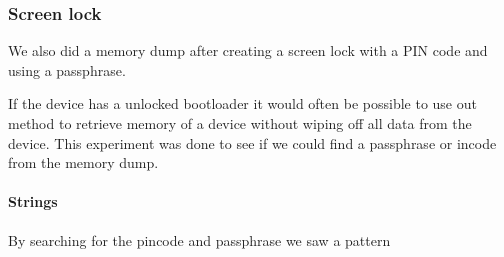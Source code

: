   \subsubsection{Screen lock}
  We also did a memory dump after creating a screen lock with a PIN code and using a passphrase.
  
  If the device has a unlocked bootloader it would often be possible to use out 
  method to retrieve memory of a device without wiping off all data from the 
  device. This experiment was done to see if we could find a passphrase or 
  incode from the memory dump.

  \paragraph{Strings}
  By searching for the pincode and passphrase we saw a pattern 
